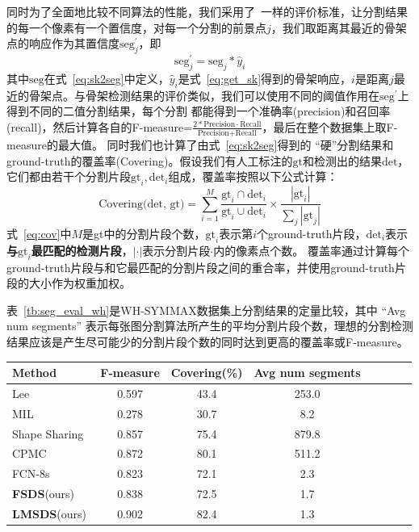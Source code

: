 \documentclass[UTF8]{ctexart}
\numberwithin{equation}{section} %
\numberwithin{table}{section} %
\begin{document}
同时为了全面地比较不同算法的性能，我们采用了~\cite{demirci2006object}一样的评价标准，让分割结果的每一个像素有一个置信度，对每一个分割的前景点$j$，我们取距离其最近的骨架点的响应作为其置信度$\text{seg}^{'}_j$，即
\begin{equation}
\text{seg}^{'}_j = \text{seg}_j * \hat{y}_i
\label{eq:soft_seg}
\end{equation}
其中$\text{seg}$在式~\ref{eq:sk2seg}中定义，$\hat{y}_i$是式~\ref{eq:get_sk}得到的骨架响应，$i$是距离$j$最近的骨架点。与骨架检测结果的评价类似，我们可以使用不同的阈值作用在$\text{seg}^{'}$上得到不同的二值分割结果，每个分割
都能得到一个准确率(precision)和召回率(recall)，然后计算各自的F-measure=$\frac{2*\text{Precision}\cdot\text{Recall}}{\text{Precision}+\text{Recall}}$，最后在整个数据集上取F-measure的最大值。
同时我们也计算了由式~\ref{eq:sk2seg}得到的
“硬”分割结果和ground-truth的覆盖率(Covering)。假设我们有人工标注的$\text{gt}$和检测出的结果$\text{det}$，它们都由若干个分割片段$\text{gt}_i, \text{det}_i$组成，覆盖率按照以下公式计算：
\begin{equation}
\text{Covering(det, gt)} = \sum_{i=1}^M \frac{\text{gt}_i \cap \text{det}_i}{\text{gt}_i \cup \text{det}_i} \times  \frac{|\text{gt}_i|}{\sum_j |\text{gt}_j|}
\label{eq:cov}
\end{equation}
式~\ref{eq:cov}中$M$是gt中的分割片段个数，$\text{gt}_i$表示第$i$个ground-truth片段，$\text{det}_i$表示\textbf{与$\text{gt}_i$最匹配的检测片段}，$|\cdot|$表示分割片段$\cdot$内的像素点个数。
覆盖率通过计算每个ground-truth片段与和它最匹配的分割片段之间的重合率，并使用ground-truth片段的大小作为权重加权。

表~\ref{tb:seg_eval_wh}是WH-SYMMAX数据集上分割结果的定量比较，其中 “Avg num segments” 表示每张图分割算法所产生的平均分割片段个数，理想的分割检测结果应该是产生尽可能少的分割片段个数的同时达到更高的覆盖率或F-measure。
\begin{center}
\begin{tabular}{l*{6}{c}r}
\hline
Method            & F-measure & Covering(\%) & Avg num segments \\
\hline
Lee~\cite{sie2013detecting} & 0.597 & 43.4 & 253.0   \\
MIL~\cite{tsogkas2012learning} & 0.278 & 30.7 & 8.2  \\
Shape Sharing~\cite{kim2012shape} & 0.857 & 75.4 & 879.8 \\
CPMC~\cite{carreira2010constrained} & 0.872 & 80.1 & 511.2 \\
FCN-8s~\cite{long2015fully} & 0.823 & 72.1 & 2.3 \\
\textbf{FSDS}(ours)     & 0.838 & 72.5 & 1.7 \\
\textbf{LMSDS}(ours)    & 0.902 & 82.4 & 1.3 \\
\hline
\end{tabular}
\label{tb:seg_eval_wh}
\end{center}
  
\end{document}
